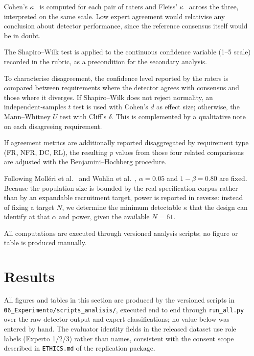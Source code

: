 \documentclass[pdflatex,sn-mathphys-num]{sn-jnl}
\theoremstyle{thmstyleone}%
\theoremstyle{thmstyletwo}%
\theoremstyle{thmstylethree}%
\begin{document}
	Cohen's $\kappa$~\cite{cohen1960} is computed for each pair of raters and
	Fleiss' $\kappa$~\cite{fleiss1971} across the three, interpreted on the same
	scale. Low expert agreement would relativise any conclusion about detector
	performance, since the reference consensus itself would be in doubt.
	
	The Shapiro--Wilk test is applied to the continuous confidence variable
	(1--5 scale) recorded in the rubric, as a precondition for the secondary
	analysis.
	
	To characterise disagreement, the confidence level reported by the raters is
	compared between requirements where the detector agrees with consensus and those
	where it diverges. If Shapiro--Wilk does not reject normality, an
	independent-samples $t$ test is used with Cohen's $d$ as effect size; otherwise,
	the Mann--Whitney $U$ test with Cliff's $\delta$. This is complemented by a
	qualitative note on each disagreeing requirement.
	
	If agreement metrics are additionally reported disaggregated by requirement type
	(FR, NFR, DC, RL), the resulting $p$ values from those four related comparisons are
	adjusted with the Benjamini--Hochberg procedure.
	
	Following Molléri et al.~\cite{molleri2020} and Wohlin et al.~\cite{wohlin2012},
	$\alpha = 0.05$ and $1-\beta = 0.80$ are fixed. Because the population size is
	bounded by the real specification corpus rather than by an expandable
	recruitment target, power is reported in reverse: instead of fixing a target
	$N$, we determine the minimum detectable $\kappa$ that the design can identify
	at that $\alpha$ and power, given the available $N = 61$.
	
	All computations are executed through versioned analysis scripts; no figure or
	table is produced manually.
	
	
	\section{Results}\label{sec:results}
	
	All figures and tables in this section are produced by the versioned scripts in
	\texttt{06\_Experimento/scripts\_analisis/}, executed end to end through
	\texttt{run\_all.py} over the raw detector output and expert classifications; no
	value below was entered by hand. The evaluator identity fields in the released
	dataset use role labels (Experto 1/2/3) rather than names, consistent with the
	consent scope described in \texttt{ETHICS.md} of the replication package.
	
\end{document}
